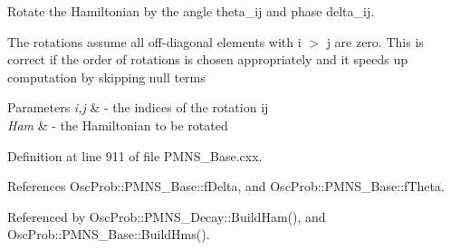 Rotate the Hamiltonian by the angle theta\+\_\+ij and phase delta\+\_\+ij.

The rotations assume all off-\/diagonal elements with i $>$ j are zero. This is correct if the order of rotations is chosen appropriately and it speeds up computation by skipping null terms


\begin{DoxyParams}{Parameters}
{\em i,j} & -\/ the indices of the rotation ij \\
\hline
{\em Ham} & -\/ the Hamiltonian to be rotated \\
\hline
\end{DoxyParams}


Definition at line 911 of file P\+M\+N\+S\+\_\+\+Base.\+cxx.



References Osc\+Prob\+::\+P\+M\+N\+S\+\_\+\+Base\+::f\+Delta, and Osc\+Prob\+::\+P\+M\+N\+S\+\_\+\+Base\+::f\+Theta.



Referenced by Osc\+Prob\+::\+P\+M\+N\+S\+\_\+\+Decay\+::\+Build\+Ham(), and Osc\+Prob\+::\+P\+M\+N\+S\+\_\+\+Base\+::\+Build\+Hms().


